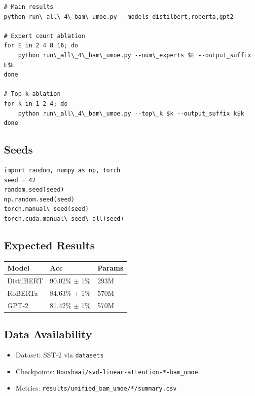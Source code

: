 \begin{lstlisting}
# Main results
python run\_all\_4\_bam\_umoe.py --models distilbert,roberta,gpt2

# Expert count ablation
for E in 2 4 8 16; do
    python run\_all\_4\_bam\_umoe.py --num\_experts $E --output_suffix E$E
done

# Top-k ablation
for k in 1 2 4; do
    python run\_all\_4\_bam\_umoe.py --top\_k $k --output_suffix k$k
done
\end{lstlisting}

\subsection{Seeds}

\begin{lstlisting}
import random, numpy as np, torch
seed = 42
random.seed(seed)
np.random.seed(seed)
torch.manual\_seed(seed)
torch.cuda.manual\_seed\_all(seed)
\end{lstlisting}

\subsection{Expected Results}

\begin{table}[H]
\centering
\small
\begin{tabular}{lll}
\toprule
\textbf{Model} & \textbf{Acc} & \textbf{Params} \\
\midrule
DistilBERT & 90.02\% $\pm$ 1\% & 293M \\
RoBERTa & 84.63\% $\pm$ 1\% & 570M \\
GPT-2 & 81.42\% $\pm$ 1\% & 570M \\
\bottomrule
\end{tabular}
\end{table}

\subsection{Data Availability}

\begin{itemize}
\item Dataset: SST-2 via \texttt{datasets}
\item Checkpoints: \texttt{Hooshaai/svd-linear-attention-*-bam\_umoe}
\item Metrics: \texttt{results/unified\_bam\_umoe/*/summary.csv}

\end{itemize}
